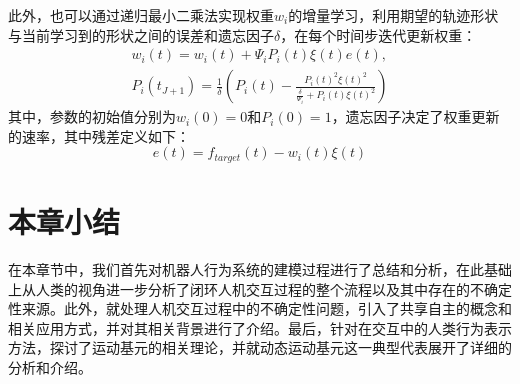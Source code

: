 此外，也可以通过递归最小二乘法实现权重$w_i$的增量学习，利用期望的轨迹形状与当前学习到的形状之间的误差和遗忘因子$\delta $，在每个时间步迭代更新权重：
\begin{equation}
    \begin{gathered}
    w_i(t)=w_i(t)+\Psi_i P_i\left(t\right) \xi(t) e\left(t\right), \\
    P_i\left(t_{J+1}\right)=\frac{1}{\delta}\left(P_i\left(t\right)-\frac{P_i\left(t\right)^2 \xi(t)^2}{\frac{\delta}{\Psi_i}+P_i\left(t\right) \xi(t)^2}\right)
    \end{gathered}
    \label{eq:2-17}
\end{equation}
其中，参数的初始值分别为$w_i(0)=0$和$P_i(0)=1$，遗忘因子决定了权重更新的速率，其中残差定义如下：
\begin{equation}
    e\left(t\right)=f_{target}\left(t\right)-w_i\left(t\right) \xi(t)
    \label{eq:2-18}
\end{equation}
\section{本章小结}
在本章节中，我们首先对机器人行为系统的建模过程进行了总结和分析，在此基础上从人类的视角进一步分析了闭环人机交互过程的整个流程以及其中存在的不确定性来源。此外，就处理人机交互过程中的不确定性问题，引入了共享自主的概念和相关应用方式，并对其相关背景进行了介绍。最后，针对在交互中的人类行为表示方法，探讨了运动基元的相关理论，并就动态运动基元这一典型代表展开了详细的分析和介绍。